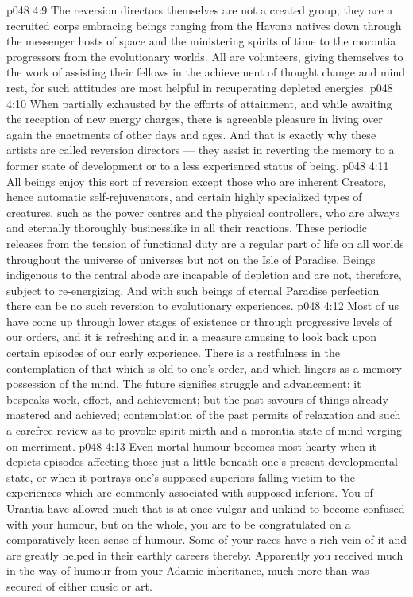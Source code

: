 \vs p048 4:9 The reversion directors themselves are not a created group; they are a recruited corps embracing beings ranging from the Havona natives down through the messenger hosts of space and the ministering spirits of time to the morontia progressors from the evolutionary worlds. All are volunteers, giving themselves to the work of assisting their fellows in the achievement of thought change and mind rest, for such attitudes are most helpful in recuperating depleted energies.
\vs p048 4:10 \pc When partially exhausted by the efforts of attainment, and while awaiting the reception of new energy charges, there is agreeable pleasure in living over again the enactments of other days and ages.  And that is exactly why these artists are called reversion directors --- they assist in reverting the memory to a former state of development or to a less experienced status of being.
\vs p048 4:11 All beings enjoy this sort of reversion except those who are inherent Creators, hence automatic self\hyp{}rejuvenators, and certain highly specialized types of creatures, such as the power centres and the physical controllers, who are always and eternally thoroughly businesslike in all their reactions. These periodic releases from the tension of functional duty are a regular part of life on all worlds throughout the universe of universes but not on the Isle of Paradise. Beings indigenous to the central abode are incapable of depletion and are not, therefore, subject to re\hyp{}energizing. And with such beings of eternal Paradise perfection there can be no such reversion to evolutionary experiences.
\vs p048 4:12 Most of us have come up through lower stages of existence or through progressive levels of our orders, and it is refreshing and in a measure amusing to look back upon certain episodes of our early experience. There is a restfulness in the contemplation of that which is old to one’s order, and which lingers as a memory possession of the mind. The future signifies struggle and advancement; it bespeaks work, effort, and achievement; but the past savours of things already mastered and achieved; contemplation of the past permits of relaxation and such a carefree review as to provoke spirit mirth and a morontia state of mind verging on merriment.
\vs p048 4:13 Even mortal humour becomes most hearty when it depicts episodes affecting those just a little beneath one’s present developmental state, or when it portrays one’s supposed superiors falling victim to the experiences which are commonly associated with supposed inferiors. You of Urantia have allowed much that is at once vulgar and unkind to become confused with your humour, but on the whole, you are to be congratulated on a comparatively keen sense of humour. Some of your races have a rich vein of it and are greatly helped in their earthly careers thereby. Apparently you received much in the way of humour from your Adamic inheritance, much more than was secured of either music or art.

